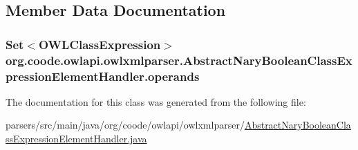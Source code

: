 \subsection{Member Data Documentation}
\hypertarget{classorg_1_1coode_1_1owlapi_1_1owlxmlparser_1_1_abstract_nary_boolean_class_expression_element_handler_a9d005ffcc6e7dac31391c38dd5e0e750}{
\subsubsection[{operands}]{\setlength{\rightskip}{0pt plus 5cm}Set$<${\bf O\-W\-L\-Class\-Expression}$>$ org.\-coode.\-owlapi.\-owlxmlparser.\-Abstract\-Nary\-Boolean\-Class\-Expression\-Element\-Handler.\-operands\hspace{0.3cm}{\ttfamily [private]}}}\label{classorg_1_1coode_1_1owlapi_1_1owlxmlparser_1_1_abstract_nary_boolean_class_expression_element_handler_a9d005ffcc6e7dac31391c38dd5e0e750}


The documentation for this class was generated from the following file\-:\begin{DoxyCompactItemize}
\item 
parsers/src/main/java/org/coode/owlapi/owlxmlparser/\hyperlink{_abstract_nary_boolean_class_expression_element_handler_8java}{Abstract\-Nary\-Boolean\-Class\-Expression\-Element\-Handler.\-java}\end{DoxyCompactItemize}
